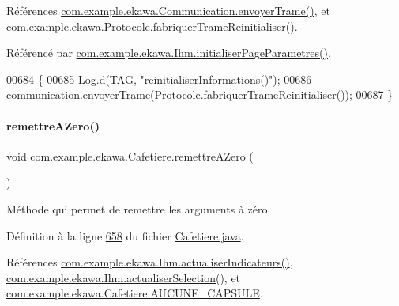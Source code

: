 Références \hyperlink{_communication_8java_source_l00309}{com.\+example.\+ekawa.\+Communication.\+envoyer\+Trame()}, et \hyperlink{_protocole_8java_source_l00126}{com.\+example.\+ekawa.\+Protocole.\+fabriquer\+Trame\+Reinitialiser()}.



Référencé par \hyperlink{_ihm_8java_source_l00835}{com.\+example.\+ekawa.\+Ihm.\+initialiser\+Page\+Parametres()}.


\begin{DoxyCode}
00684     \{
00685         Log.d(\hyperlink{classcom_1_1example_1_1ekawa_1_1_cafetiere_aa0c1fd99a2508b06c462aea17034aa91}{TAG}, \textcolor{stringliteral}{"reinitialiserInformations()"});
00686         \hyperlink{classcom_1_1example_1_1ekawa_1_1_cafetiere_af9506a7805d000d2cb83444cdb8ea889}{communication}.\hyperlink{classcom_1_1example_1_1ekawa_1_1_communication_a98808d0236e547b9a3ee485f66aa7af0}{envoyerTrame}(Protocole.fabriquerTrameReinitialiser());
00687     \}
\end{DoxyCode}
\mbox{\label{classcom_1_1example_1_1ekawa_1_1_cafetiere_a10a040b45cfaac52cd5c26049bf2d7b7}} 
\paragraph{\texorpdfstring{remettre\+A\+Zero()}{remettreAZero()}}
{\footnotesize\ttfamily void com.\+example.\+ekawa.\+Cafetiere.\+remettre\+A\+Zero (\begin{DoxyParamCaption}{ }\end{DoxyParamCaption})}



Méthode qui permet de remettre les arguments à zéro. 



Définition à la ligne \hyperlink{_cafetiere_8java_source_l00658}{658} du fichier \hyperlink{_cafetiere_8java_source}{Cafetiere.\+java}.



Références \hyperlink{_ihm_8java_source_l00855}{com.\+example.\+ekawa.\+Ihm.\+actualiser\+Indicateurs()}, \hyperlink{_ihm_8java_source_l00892}{com.\+example.\+ekawa.\+Ihm.\+actualiser\+Selection()}, et \hyperlink{_cafetiere_8java_source_l00028}{com.\+example.\+ekawa.\+Cafetiere.\+A\+U\+C\+U\+N\+E\+\_\+\+C\+A\+P\+S\+U\+LE}.



